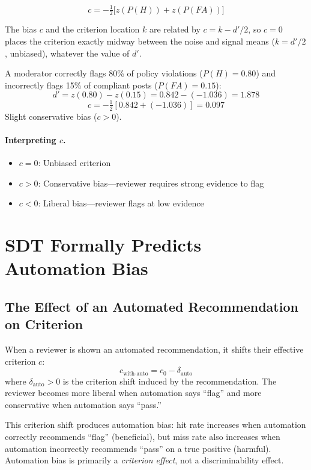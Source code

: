 \[
c = -\tfrac{1}{2}\bigl[z(P(H)) + z(P(FA))\bigr]
\]

The bias $c$ and the criterion location $k$ are related by $c = k - d'/2$, so $c = 0$ places the criterion exactly midway between the noise and signal means ($k = d'/2$, unbiased), whatever the value of $d'$.

\begin{examplebox}
A moderator correctly flags 80\% of policy violations ($P(H) = 0.80$) and incorrectly flags 15\% of compliant posts ($P(FA) = 0.15$):
\[
d' = z(0.80) - z(0.15) = 0.842 - (-1.036) = 1.878
\]
\[
c = -\tfrac{1}{2}[0.842 + (-1.036)] = 0.097
\]
Slight conservative bias ($c > 0$).
\end{examplebox}

\paragraph{Interpreting $c$.}
\begin{itemize}
    \item $c = 0$: Unbiased criterion
    \item $c > 0$: Conservative bias---reviewer requires strong evidence to flag
    \item $c < 0$: Liberal bias---reviewer flags at low evidence
\end{itemize}

\section{SDT Formally Predicts Automation Bias}

\subsection{The Effect of an Automated Recommendation on Criterion}

When a reviewer is shown an automated recommendation, it shifts their effective criterion $c$:
\[
c_{\text{with-auto}} = c_0 - \delta_{\text{auto}}
\]
where $\delta_{\text{auto}} > 0$ is the criterion shift induced by the recommendation. The reviewer becomes more liberal when automation says ``flag'' and more conservative when automation says ``pass.''

This criterion shift produces automation bias: hit rate increases when automation correctly recommends ``flag'' (beneficial), but miss rate also increases when automation incorrectly recommends ``pass'' on a true positive (harmful). Automation bias is primarily a \emph{criterion effect}, not a discriminability effect.

